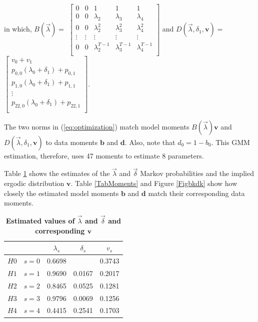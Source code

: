 \documentclass[letterpaper,12pt]{article}
\theoremstyle{definition}
\begin{document}
\begin{spacing}{1.5}{}
  in which,
  \vspace{6mm}
  \newline
  $B(\vec{\lambda}) =$
  $\begin{bmatrix}
      0 & 0 & 1 & 1 & 1 \\
      0 & 0 & \lambda_2 & \lambda_3 & \lambda_4 \\
      0 & 0 & \lambda_2^2 & \lambda_3^2 & \lambda_4^2 \\
      \vdots & \vdots & \vdots & \vdots & \vdots\\
      0 & 0 & \lambda_2^{T-1} & \lambda_3^{T-1} & \lambda_4^{T-1}\\
  \end{bmatrix}$
  and $D(\vec{\lambda}, \delta_1, \textbf{v}) = $
  $\begin{bmatrix}
      v_0 + v_1 \\
      p_{0, 0}(\lambda_0 + \delta_1) + p_{0, 1} \\
      p_{1, 0}(\lambda_0 + \delta_1) + p_{1, 1} \\
      \vdots \\
      p_{22, 0}(\lambda_0 + \delta_1) + p_{22, 1}\\
  \end{bmatrix}$.
  \vspace{6mm}
    
  \noindent The two norms in (\ref{eq:optimization}) match model moments $B(\vec{\lambda})\textbf{v}$ and $D(\vec{\lambda}, \delta_1, \textbf{v})$ to data moments $\textbf{b}$ and $\textbf{d}$. Also, note that $d_0 = 1 - b_0$. This GMM estimation, therefore, uses 47 moments to estimate 8 parameters.
    
  Table \ref{TabParams} shows the estimates of the $\vec{\lambda}$ and $\vec{\delta}$ Markov probabilities and the implied ergodic distribution $\textbf{v}$. Table \ref{TabMoments} and Figure \ref{Figbkdk} show how closely the estimated model moments $\textbf{b}$ and $\textbf{d}$ match their corresponding data moments. 
  
  \begin{table}[h!] \centering \captionsetup{width=3.0in}
    \caption{\label{TabParams}\textbf{Estimated values of $\vec{\lambda}$ and $\vec{\delta}$ and corresponding $\textbf{v}$}}
      \begin{tabular}{ c c | c  c  c }
      \hline\hline
        & & $\lambda_s$ & $\delta_s$ & $v_s$\\
      \hline
      $H0$ & $s = 0$ & 0.6698 &  & 0.3743 \\
      $H1$ & $s = 1$ & 0.9690 & 0.0167 & 0.2017 \\
      $H2$ & $s = 2$ & 0.8465 & 0.0525 & 0.1281 \\
      $H3$ & $s = 3$ & 0.9796 & 0.0069 & 0.1256 \\
      $H4$ & $s = 4$ & 0.4415 & 0.2541 & 0.1703 \\
      \hline\hline
    \end{tabular}
  \end{table}   


\end{spacing}
\end{document}

